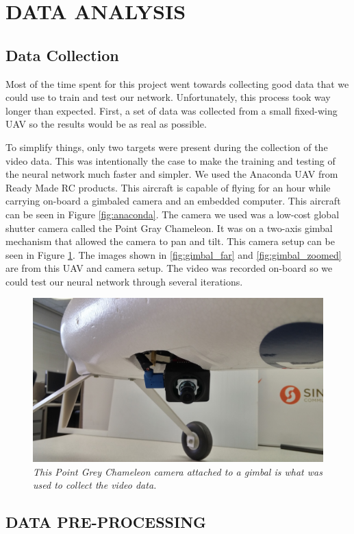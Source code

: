 \documentclass[letterpaper, 10 pt, conference]{ieeeconf}  %
\begin{document}
\section{DATA ANALYSIS} \label{DATA}

\subsection{Data Collection}
Most of the time spent for this project went towards collecting good data that we could use to train and test our network. Unfortunately, this process took way longer than expected. First, a set of data was collected from a small fixed-wing UAV so the results would be as real as possible. 

To simplify things, only two targets were present during the collection of the video data. This was intentionally the case to make the training and testing of the neural network much faster and simpler. We used the Anaconda UAV from Ready Made RC products. This aircraft is capable of flying for an hour while carrying on-board a gimbaled camera and an embedded computer. This aircraft can be seen in Figure \ref{fig:anaconda}. The camera we used was a low-cost global shutter camera called the Point Gray Chameleon. It was on a two-axis gimbal mechanism that allowed the camera to pan and tilt. This camera setup can be seen in Figure \ref{fig:gimbal}. The images shown in \ref{fig:gimbal_far} and \ref{fig:gimbal_zoomed} are from this UAV and camera setup. The video was recorded on-board so we could test our neural network through several iterations.

\begin{figure}
	\begin{center}
		\includegraphics[width=.45\textwidth]{gimbal.jpg}
		\caption{\textit{This Point Grey Chameleon camera attached to a gimbal is what was used to collect the video data.}} 
		\label{fig:gimbal}
	\end{center}
\end{figure}

\subsection{DATA PRE-PROCESSING}
\end{document}
